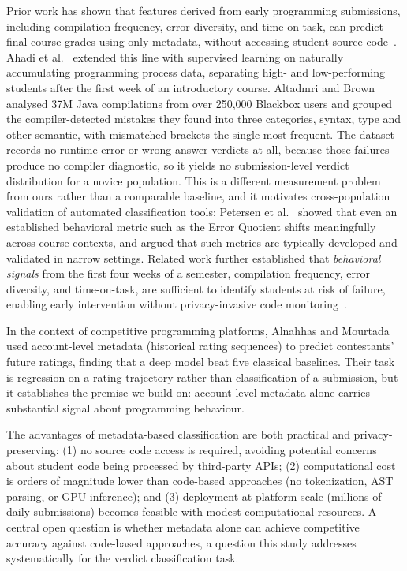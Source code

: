 \documentclass[acmsmall]{acmart}
\begin{document}
Prior work has shown that features derived from early
programming submissions, including compilation frequency, error diversity,
and time-on-task, can predict final course grades using only metadata,
without accessing student source code~\cite{jadud2006methods,brown2014blackbox}. Ahadi et
al.~\cite{ahadi2015exploring} extended this line with supervised learning on
naturally accumulating programming process data, separating high- and
low-performing students after the first week of an introductory course. Altadmri and Brown~\cite{altadmri2015most} analysed 37M Java
compilations from over 250{,}000 Blackbox users and grouped the
compiler-detected mistakes they found into three categories, syntax, type and
other semantic, with mismatched brackets the single most frequent. The dataset
records no runtime-error or wrong-answer verdicts at all, because those failures
produce no compiler diagnostic, so it yields no submission-level verdict
distribution for a novice population. This is a different measurement problem
from ours rather than a comparable baseline, and it motivates cross-population
validation of automated classification tools: Petersen et
al.~\cite{petersen2015exploration} showed that even an established behavioral
metric such as the Error Quotient shifts meaningfully across course contexts, and
argued that such metrics are typically developed and validated in narrow
settings. Related work further established that
\textit{behavioral signals} from the first four weeks of a semester, compilation frequency, error diversity, and time-on-task, are sufficient to identify students at risk of failure, enabling early
intervention without privacy-invasive code monitoring~\cite{jadud2006methods,brown2014blackbox}.

In the context of competitive programming platforms, Alnahhas and
Mourtada~\cite{alnahhas2020predicting} used account-level metadata (historical
rating sequences) to predict contestants' future ratings, finding that a deep
model beat five classical baselines. Their task is regression on a rating
trajectory rather than classification of a submission, but it establishes the
premise we build on: account-level metadata alone carries substantial signal
about programming behaviour.

The advantages of metadata-based classification are both practical and
privacy-preserving: (1) no source code access is required, avoiding
potential concerns about student code being processed by third-party APIs;
(2) computational cost is orders of magnitude lower than code-based
approaches (no tokenization, AST parsing, or GPU inference); and
(3) deployment at platform scale (millions of daily submissions) becomes
feasible with modest computational resources. A central open question
is whether metadata alone can achieve competitive accuracy against
code-based approaches, a question this study addresses
systematically for the verdict classification task.
\end{document}
